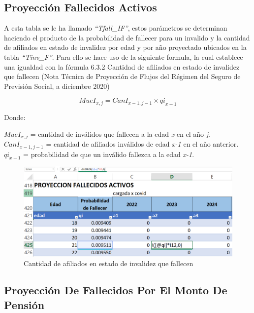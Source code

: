 \documentclass[
  letterpaper,
  DIV=11,
  numbers=noendperiod]{scrreprt}
\begin{document}
\hypertarget{proyecciuxf3n-fallecidos-activos-1}{%
\subsection{Proyección Fallecidos
Activos}\label{proyecciuxf3n-fallecidos-activos-1}}

A esta tabla se le ha llamado \emph{``Tfall\_IF''}, estos parámetros se
determinan haciendo el producto de la probabilidad de fallecer para un
invalido y la cantidad de afiliados en estado de invalidez por edad y
por año proyectado ubicados en la tabla \emph{``Tinv\_F''}. Para ello se
hace uso de la siguiente formula, la cual establece una igualdad con la
fórmula 6.3.2 Cantidad de afiliados en estado de invalidez que fallecen
(Nota Técnica de Proyección de Flujos del Régimen del Seguro de
Previsión Social, a diciembre 2020)

\begin{equation}
MueI_{x,j}=CanI_{x-1,j-1}\times{qi}_{x-1}
\end{equation}

Donde:

\(MueI_{x,j}\) = cantidad de inválidos que fallecen a la edad \emph{x}
en el año \emph{j}.\\
\(CanI_{x-1,j-1}\) = cantidad de afiliados inválidos de edad \emph{x-1}
en el año anterior.\\
\({qi}_{x-1}\) = probabilidad de que un inválido fallezca a la edad
\emph{x-1}.

\begin{figure}

{\centering \includegraphics{images/F/Img40.png}

}

\caption{Cantidad de afiliados en estado de invalidez que fallecen}

\end{figure}

\hypertarget{proyecciuxf3n-de-fallecidos-por-el-monto-de-pensiuxf3n-2}{%
\subsection{Proyección De Fallecidos Por El Monto De
Pensión}\label{proyecciuxf3n-de-fallecidos-por-el-monto-de-pensiuxf3n-2}}
\end{document}
